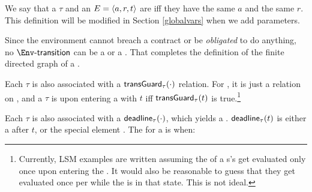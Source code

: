 \documentclass[12pt]{article}
\begin{document}
We say that a \transition $\tau$ and an \Event $E = \langle a,r,t\rangle$ are  iff they have the same \Action $a$ and the same \Role $r$. This definition will be modified in Section \ref{globalvars} when we add \Event parameters.
\medskip



Since the environment \Env cannot breach a contract or be {\it obligated} to do anything, no $\depTrans{\Env}$ can be a \mustntran or a \rmustntran.
That completes the definition of the finite directed graph \skeleton of a \Contract.

\medskip

Each \transition $\tau$ is also associated with a  $\textsf{transGuard}_{\tau}(\cdot)$ relation. For \FSContracts, it is just a relation on \TimeStamps,
and a \transition $\tau$ is  upon entering a \GlobalState with \TimeStamp $t$ iff $\textsf{transGuard}_{\tau}(t)$ is true.\footnote{Currently, LSM examples are written assuming the \TGuards of a \State s's \transitions get evaluated only once upon entering the \State. It would also be reasonable to guess that they get evaluated once per \TimeUnit while the \Contract is in that state. This is not ideal.}  

\medskip

Each \transition $\tau$ is also associated with a  $\textsf{deadline}_{\tau}(\cdot)$, which yields a . $\textsf{deadline}_{\tau}(t)$ is either a \TimeStamp after $t$, or the special element . The \Deadline for a \transition is when:
\end{document}
